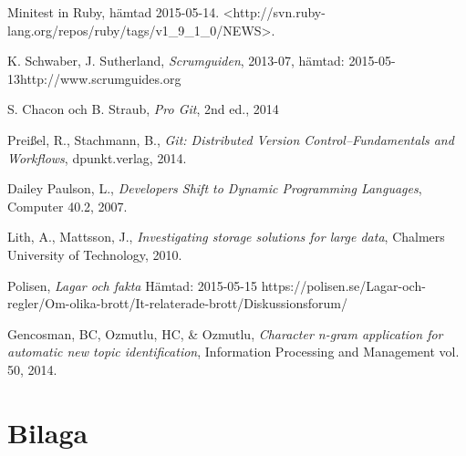 \documentclass[a4paper,12pt,oneside,final]{extbook}
\begin{document}
\begin{thebibliography}{99}
  Minitest in Ruby, hämtad 2015-05-14.
  \newline<http://svn.ruby-lang.org/repos/ruby/tags/v1\_9\_1\_0/NEWS>.

  K. Schwaber, J. Sutherland, \emph{Scrumguiden}, 2013-07, hämtad: 2015-05-13\newline http://www.scrumguides.org

  S. Chacon och B. Straub, \emph{Pro Git}, 2nd ed., 2014

  Preißel, R., Stachmann, B., \emph{Git: Distributed Version Control--Fundamentals and Workflows}, dpunkt.verlag, 2014.

  Dailey Paulson, L., \emph{Developers Shift to Dynamic Programming Languages}, Computer 40.2, 2007.

  Lith, A., Mattsson, J., \emph{Investigating storage solutions for large data}, Chalmers University of Technology, 2010.

  Polisen, \emph{Lagar och fakta} Hämtad: 2015-05-15
  \newline https://polisen.se/Lagar-och-regler/Om-olika-brott/It-relaterade-brott/Diskussionsforum/

  Gencosman, BC, Ozmutlu, HC, \& Ozmutlu, \emph{Character n-gram application for automatic new topic identification},
  Information Processing and Management vol. 50, 2014.

\end{thebibliography}


\appendix

\chapter{Bilaga}
\end{document}
